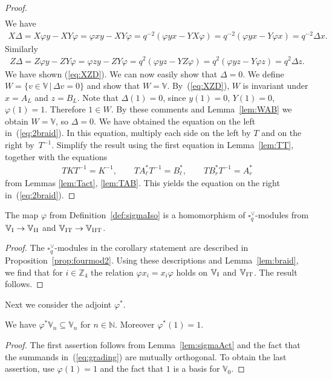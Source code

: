 \begin{proof}
\begin{gather}
\label{eq:XZD}
\end{gather}
We have
\begin{gather*}
X \Delta = X \varphi y - X Y \varphi
= \varphi x y - X Y \varphi
= q^{-2}(\varphi y x - Y X \varphi)
= q^{-2}(\varphi y x - Y \varphi x)
= q^{-2}\Delta x.
\end{gather*}
Similarly
\begin{gather*}
Z \Delta = Z \varphi y - Z Y \varphi
= \varphi z y - Z Y \varphi
= q^{2}(\varphi y z - Y Z \varphi)
= q^{2}(\varphi y z - Y \varphi z)
= q^{2}\Delta z.
\end{gather*}
We have shown (\ref{eq:XZD}). We can now easily show that $\Delta = 0$. We define $W=\lbrace v \in \mathbb V\,|\, \Delta v = 0\rbrace$ and show that $W=\mathbb V$. By~(\ref{eq:XZD}), $W$ is invariant under $x=A_L$ and $z=B_L$. Note that $\Delta (1)=0$, since $y(1)=0$, $Y(1)=0$, $\varphi (1)=1$. Therefore $1 \in W$.
By these comments and Lemma~\ref{lem:WAB} we obtain $W=\mathbb V$, so $\Delta=0$. We have obtained
the equation on the left in~(\ref{eq:2braid}). In this equation, multiply each side on the left by $T$ and on the right by~$T^{-1}$. Simplify the result using the first equation in Lemma~\ref{lem:TT}, together with the equations
\begin{gather*}
TKT^{-1}= K^{-1},\qquad T A^*_\ell T^{-1} = B^*_{\ell},\qquad T B^*_r T^{-1} = A^*_r
\end{gather*}
from Lemmas \ref{lem:Tact}, \ref{lem:TAB}. This yields the equation on the right in~(\ref{eq:2braid}).
\end{proof}

\begin{Corollary}\label{cor:hom}The map $\varphi$ from Definition~{\rm \ref{def:sigmaIso}} is a homomorphism of $\square^\vee_q$-modules from $\mathbb V_{\rm I} \to \mathbb V_{\rm II}$ and $\mathbb V_{\rm IT} \to \mathbb V_{\rm IIT}$.
\end{Corollary}
\begin{proof}The $\square^\vee_q$-modules in the corollary statement are described in Proposition~\ref{prop:fourmod2}. Using these descriptions and Lemma~\ref{lem:braid}, we find that for $i \in \mathbb Z_4$ the relation $ \varphi x_i = x_i \varphi$ holds on $\mathbb V_{\rm I}$ and $\mathbb V_{\rm IT}$. The result follows.
\end{proof}

Next we consider the adjoint $\varphi^*$.

\begin{Lemma}\label{lem:adjphi} We have $\varphi^* \mathbb V_n \subseteq \mathbb V_n$ for $n \in \mathbb N$. Moreover $\varphi^*(1)=1$.
\end{Lemma}
\begin{proof} The first assertion follows from Lemma~\ref{lem:sigmaAct} and the fact that the summands in~(\ref{eq:grading}) are mutually orthogonal. To obtain the last assertion, use $\varphi(1)=1$ and the
fact that $1$ is a basis for $\mathbb V_0$.
\end{proof}

